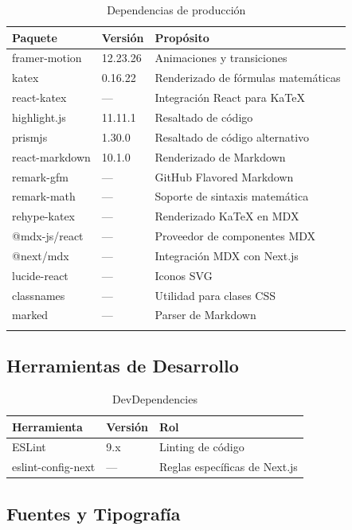 \documentclass[12pt,a4paper]{article}
\begin{document}
\begin{longtable}{lll}
\toprule
\textbf{Paquete} & \textbf{Versión} & \textbf{Propósito} \\
\midrule
\endhead
framer-motion & 12.23.26 & Animaciones y transiciones \\
katex & 0.16.22 & Renderizado de fórmulas matemáticas \\
react-katex & --- & Integración React para KaTeX \\
highlight.js & 11.11.1 & Resaltado de código \\
prismjs & 1.30.0 & Resaltado de código alternativo \\
react-markdown & 10.1.0 & Renderizado de Markdown \\
remark-gfm & --- & GitHub Flavored Markdown \\
remark-math & --- & Soporte de sintaxis matemática \\
rehype-katex & --- & Renderizado KaTeX en MDX \\
@mdx-js/react & --- & Proveedor de componentes MDX \\
@next/mdx & --- & Integración MDX con Next.js \\
lucide-react & --- & Iconos SVG \\
classnames & --- & Utilidad para clases CSS \\
marked & --- & Parser de Markdown \\
\bottomrule
\caption{Dependencias de producción}
\end{longtable}

\subsection{Herramientas de Desarrollo}

\begin{table}[h]
\centering
\begin{tabular}{lll}
\toprule
\textbf{Herramienta} & \textbf{Versión} & \textbf{Rol} \\
\midrule
ESLint & 9.x & Linting de código \\
eslint-config-next & --- & Reglas específicas de Next.js \\
\bottomrule
\end{tabular}
\caption{DevDependencies}
\end{table}

\subsection{Fuentes y Tipografía}
\end{document}
